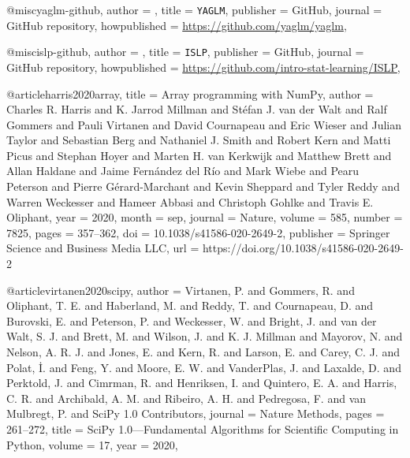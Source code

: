 @misc{yaglm-github,
  author = {},
  title = {\texttt{YAGLM}},
  publisher = {GitHub},
  journal = {GitHub repository},
  howpublished = {\url{https://github.com/yaglm/yaglm}},
}

@misc{islp-github,
  author = {},
  title = {\texttt{ISLP}},
  publisher = {GitHub},
  journal = {GitHub repository},
  howpublished = {\url{https://github.com/intro-stat-learning/ISLP}},
}

@article{harris2020array,
 title         = {Array programming with {NumPy}},
 author        = {Charles R. Harris and K. Jarrod Millman and St{\'{e}}fan J.
                 van der Walt and Ralf Gommers and Pauli Virtanen and David
                 Cournapeau and Eric Wieser and Julian Taylor and Sebastian
                 Berg and Nathaniel J. Smith and Robert Kern and Matti Picus
                 and Stephan Hoyer and Marten H. van Kerkwijk and Matthew
                 Brett and Allan Haldane and Jaime Fern{\'{a}}ndez del
                 R{\'{i}}o and Mark Wiebe and Pearu Peterson and Pierre
                 G{\'{e}}rard-Marchant and Kevin Sheppard and Tyler Reddy and
                 Warren Weckesser and Hameer Abbasi and Christoph Gohlke and
                 Travis E. Oliphant},
 year          = {2020},
 month         = sep,
 journal       = {Nature},
 volume        = {585},
 number        = {7825},
 pages         = {357--362},
 doi           = {10.1038/s41586-020-2649-2},
 publisher     = {Springer Science and Business Media {LLC}},
 url           = {https://doi.org/10.1038/s41586-020-2649-2}
}

@article{virtanen2020scipy,
  author =        {Virtanen, P. and Gommers, R. and Oliphant, T. E. and
                   Haberland, M. and Reddy, T. and Cournapeau, D. and
                   Burovski, E. and Peterson, P. and Weckesser, W. and
                   Bright, J. and van der Walt, S. J. and Brett, M. and
                   Wilson, J. and K. J. Millman and Mayorov, N. and
                   Nelson, A. R. J. and Jones, E. and Kern, R. and
                   Larson, E. and Carey, C. J. and Polat, \.{I}. and
                   Feng, Y. and Moore, E. W. and VanderPlas, J. and
                   Laxalde, D. and Perktold, J. and Cimrman, R. and
                   Henriksen, I. and Quintero, E. A. and Harris, C. R. and
                   Archibald, A. M. and Ribeiro, A. H. and Pedregosa, F. and
                   van Mulbregt, P. and {SciPy 1.0 Contributors}},
  journal =       {Nature Methods},
  pages =         {261--272},
  title =         {{SciPy} 1.0---Fundamental Algorithms for Scientific
                   Computing in {Python}},
  volume =        {17},
  year =          {2020},
}

